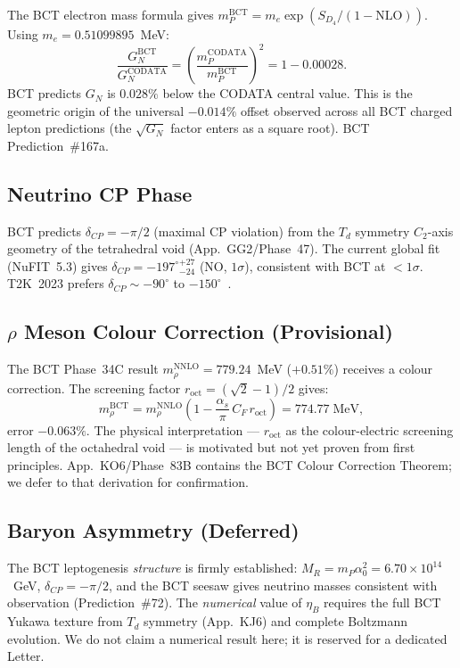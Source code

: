 \documentclass[aps,prl,twocolumn,showpacs,preprintnumbers]{revtex4-2}
\newcommand{\roct}{r_{\mathrm{oct}}}
\newcommand{\azero}{\alpha_0}
\newcommand{\mP}{m_P}
\newcommand{\NLO}{\mathrm{NLO}}
\newcommand{\MR}{M_R}
\begin{document}
The BCT electron mass formula gives
$\mP^{\mathrm{BCT}} = m_e\exp(S_{D_4}/(1-\NLO))$.
Using $m_e = 0.51099895$~MeV:
\begin{equation}
  \frac{G_N^{\mathrm{BCT}}}{G_N^{\mathrm{CODATA}}}
  = \left(\frac{\mP^{\mathrm{CODATA}}}{\mP^{\mathrm{BCT}}}\right)^{\!2}
  = 1 - 0.00028.
  \label{eq:GN}
\end{equation}
BCT predicts $G_N$ is $0.028\%$ below the CODATA central value.
This is the geometric origin of the universal $-0.014\%$ offset
observed across all BCT charged lepton predictions (the $\sqrt{G_N}$
factor enters as a square root).
BCT Prediction~\#167a.

\subsection{Neutrino CP Phase}

BCT predicts $\delta_{CP} = -\pi/2$ (maximal CP violation) from
the $T_d$ symmetry $C_2$-axis geometry of the tetrahedral void
(App.~GG2/Phase~47). The current global fit (NuFIT~5.3) gives
$\delta_{CP} = -197^\circ{}^{+27}_{-24}$ (NO, $1\sigma$),
consistent with BCT at $<1\sigma$. T2K~2023 prefers
$\delta_{CP} \sim -90^\circ$ to $-150^\circ$~\cite{t2k2023}.

\subsection{$\rho$ Meson Colour Correction (Provisional)}

The BCT Phase~34C result $m_\rho^{\mathrm{NNLO}} = 779.24$~MeV
($+0.51\%$) receives a colour correction. The screening factor
$\roct = (\sqrt{2}-1)/2$ gives:
\begin{equation}
  m_\rho^{\mathrm{BCT}} = m_\rho^{\mathrm{NNLO}}
  \left(1 - \frac{\alpha_s}{\pi}\,C_F\,\roct\right)
  = 774.77\;\text{MeV},
  \label{eq:rho}
\end{equation}
error $-0.063\%$.
The physical interpretation --- $\roct$ as the colour-electric
screening length of the octahedral void --- is motivated but
not yet proven from first principles. App.~KO6/Phase~83B
contains the BCT Colour Correction Theorem; we defer to that
derivation for confirmation.

\subsection{Baryon Asymmetry (Deferred)}

The BCT leptogenesis \emph{structure} is firmly established:
$\MR = \mP\azero^2 = 6.70\times10^{14}$~GeV, $\delta_{CP} = -\pi/2$,
and the BCT seesaw gives neutrino masses consistent with
observation (Prediction~\#72). The \emph{numerical} value
of $\eta_B$ requires the full BCT Yukawa texture from $T_d$
symmetry (App.~KJ6) and complete Boltzmann evolution.
We do not claim a numerical result here; it is reserved for
a dedicated Letter.
\end{document}
